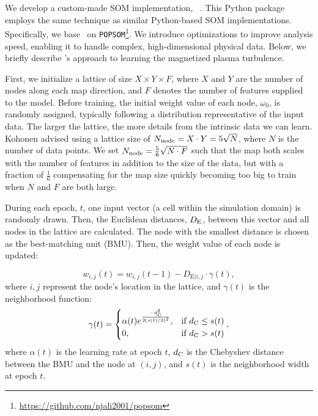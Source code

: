 We develop a custom-made SOM implementation, \awesom\ \citep{ha_awesom_2025}.
This Python package employs the same technique as similar Python-based SOM implementations. Specifically, we base \awesom\ on \texttt{POPSOM}\footnote{\url{https://github.com/njali2001/popsom}}.
We introduce optimizations to improve analysis speed, enabling it to handle complex, high-dimensional physical data.
Below, we briefly describe \awesom's approach to learning the magnetized plasma turbulence.

First, we initialize a lattice of size $X\times Y \times F$, where $X$ and $Y$ are the number of nodes along each map direction, and $F$ denotes the number of features supplied to the model.
Before training, the initial weight value of each node, $\omega_0$, is randomly assigned, typically following a distribution representative of the input data.
The larger the lattice, the more details from the intrinsic data we can learn.
Kohonen \citep{kohonen_self-organizing_1990} advised using a lattice size of $N_{\rm node} = X \cdot Y = 5 \sqrt{N}$, where $N$ is the number of data points. We set $N_{\rm node} = \frac{5}{6} \sqrt{N \cdot F}$ such that the map both scales with the number of features in addition to the size of the data, but with a fraction of $\frac{1}{6}$ compensating for the map size quickly becoming too big to train when $N$ and $F$ are both large.

During each epoch, $t$, one input vector (a cell within the simulation domain) is randomly drawn.
Then, the Euclidean distances, $D_{\rm E}$, between this vector and all nodes in the lattice are calculated.
The node with the smallest distance is chosen as the best-matching unit (BMU)\@.
Then, the weight value of each node is updated:

\begin{equation}
    w_{i,j}(t) = w_{i,j}(t-1) - D_{\mathrm{E}|i,j} \cdot \gamma(t),
\end{equation}
where $i,j$ represent the node's location in the lattice, and $\gamma(t)$ is the neighborhood function:
\begin{equation}
    \gamma(t)= \begin{cases}
        \alpha(t) e^{\frac{-d_{\rm C}^2}{2(s(t)/3)^2}}, & \text{if $d_{\rm C} \leq s(t)$}\\
        0, & \text{if $d_{\rm C} > s(t)$}
    \end{cases},
\end{equation}
where $\alpha(t)$ is the learning rate at epoch $t$, $d_{\rm C}$ is the Chebyshev distance between the BMU and the node at $(i,j)$, and $s(t)$ is the neighborhood width at epoch $t$.

